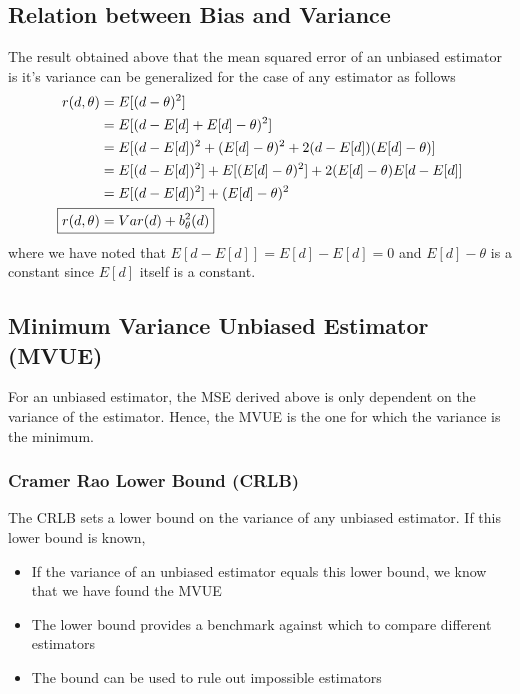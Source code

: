 \documentclass[../probability-notes.tex]{subfiles}
\begin{document}
    \subsection{Relation between Bias and Variance}
    The result obtained above that the mean squared error of an unbiased estimator is it's variance can be generalized for the case of any estimator as follows
    \begin{align*}
        r(d, \theta) &= E[(d - \theta)^{2}]\\
        &= E[(d - E[d] + E[d] -\theta)^{2}]\\
        &= E[(d - E[d])^{2} + (E[d] - \theta)^{2} + 2(d - E[d])(E[d] - \theta)]\\
        &= E[(d - E[d])^{2}] + E[(E[d] - \theta)^{2}] + 2(E[d] - \theta)E[d - E[d]]\\
        &= E[(d - E[d])^{2}] + (E[d] - \theta)^{2}\\
        \Aboxed{r(d, \theta) &= Var(d) + b_{\theta}^{2}(d)}\\
    \end{align*}
    where we have noted that $E[d - E[d]] = E[d] - E[d] = 0$ and $E[d] - \theta$ is a constant since $E[d]$ itself is a constant.

    \subsection{Minimum Variance Unbiased Estimator (MVUE)}
    For an unbiased estimator, the MSE derived above is only dependent on the variance of the estimator. Hence, the MVUE is the one for which the variance is the minimum.

    \subsubsection{Cramer Rao Lower Bound (CRLB)}
    The CRLB sets a lower bound on the variance of any unbiased estimator. If this lower bound is known,
    \begin{itemize}
        \item If the variance of an unbiased estimator equals this lower bound, we know that we have found the MVUE
        \item The lower bound provides a benchmark against which to compare different estimators
        \item The bound can be used to rule out impossible estimators
    \end{itemize}
\end{document}
